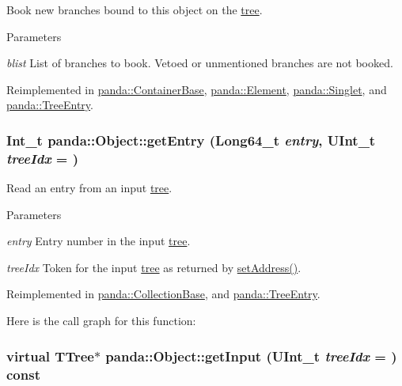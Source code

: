 Book new branches bound to this object on the \hyperlink{namespacepanda_1_1tree}{tree}. 
\begin{DoxyParams}{Parameters}
\item[{\em blist}]List of branches to book. Vetoed or unmentioned branches are not booked. \end{DoxyParams}


Reimplemented in \hyperlink{classpanda_1_1ContainerBase_a940f2c42e10910ba3bc87369347cc97d}{panda::ContainerBase}, \hyperlink{classpanda_1_1Element_abc35d69770d86c6c22cb38902383f82a}{panda::Element}, \hyperlink{classpanda_1_1Singlet_a670d14c939ce004ed6207dcddd0890eb}{panda::Singlet}, and \hyperlink{classpanda_1_1TreeEntry_a2ad0cb0f4cdaca3292274a6c94f5ae2f}{panda::TreeEntry}.\hypertarget{classpanda_1_1Object_a08f9b3d452bc056cf3a285dfad15e5ac}{
\subsubsection[{getEntry}]{\setlength{\rightskip}{0pt plus 5cm}Int\_\-t panda::Object::getEntry (Long64\_\-t {\em entry}, \/  UInt\_\-t {\em treeIdx} = {})}}
\label{classpanda_1_1Object_a08f9b3d452bc056cf3a285dfad15e5ac}


Read an entry from an input \hyperlink{namespacepanda_1_1tree}{tree}. 
\begin{DoxyParams}{Parameters}
\item[{\em entry}]Entry number in the input \hyperlink{namespacepanda_1_1tree}{tree}. \item[{\em treeIdx}]Token for the input \hyperlink{namespacepanda_1_1tree}{tree} as returned by \hyperlink{classpanda_1_1Object_aed9f9d3b6abe518dd27957de843b36b5}{setAddress()}. \end{DoxyParams}


Reimplemented in \hyperlink{classpanda_1_1CollectionBase_a777e26ce2cc4f86e7cc4eb345b0a78d7}{panda::CollectionBase}, and \hyperlink{classpanda_1_1TreeEntry_a6ac8a1bad151367648aedd366011172d}{panda::TreeEntry}.

Here is the call graph for this function:\hypertarget{classpanda_1_1Object_a69038e1ce9bc60222bb0ba7e7f933bd5}{
\subsubsection[{getInput}]{\setlength{\rightskip}{0pt plus 5cm}virtual TTree$\ast$ panda::Object::getInput (UInt\_\-t {\em treeIdx} = {}) const}}
\label{classpanda_1_1Object_a69038e1ce9bc60222bb0ba7e7f933bd5}


